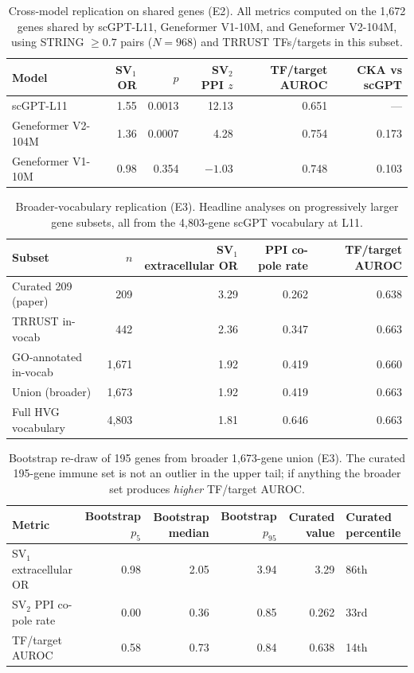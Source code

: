 \documentclass[12pt]{article}
\begin{document}
\begin{table}[!ht]
\centering
\caption{Cross-model replication on shared genes (E2). All metrics computed on the 1{,}672 genes shared by scGPT-L11, Geneformer V1-10M, and Geneformer V2-104M, using STRING $\geq 0.7$ pairs ($N = 968$) and TRRUST TFs/targets in this subset.}
\label{tab:cross_model}
\begin{tabular}{lrrrrr}
\toprule
Model & SV$_1$ OR & $p$ & SV$_2$ PPI $z$ & TF/target AUROC & CKA vs scGPT \\
\midrule
scGPT-L11           & 1.55 & 0.0013 & 12.13 & 0.651 & --- \\
Geneformer V2-104M  & 1.36 & 0.0007 &  4.28 & 0.754 & 0.173 \\
Geneformer V1-10M   & 0.98 & 0.354  & $-1.03$ & 0.748 & 0.103 \\
\bottomrule
\end{tabular}
\end{table}

\begin{table}[!ht]
\centering
\caption{Broader-vocabulary replication (E3). Headline analyses on progressively larger gene subsets, all from the 4{,}803-gene scGPT vocabulary at L11.}
\label{tab:broader_vocab}
\begin{tabular}{lrrrr}
\toprule
Subset & $n$ & SV$_1$ extracellular OR & PPI co-pole rate & TF/target AUROC \\
\midrule
Curated 209 (paper)        &   209 & 3.29 & 0.262 & 0.638 \\
TRRUST in-vocab            &   442 & 2.36 & 0.347 & 0.663 \\
GO-annotated in-vocab      & 1{,}671 & 1.92 & 0.419 & 0.660 \\
Union (broader)            & 1{,}673 & 1.92 & 0.419 & 0.663 \\
Full HVG vocabulary        & 4{,}803 & 1.81 & 0.646 & 0.663 \\
\bottomrule
\end{tabular}
\end{table}

\begin{table}[!ht]
\centering
\caption{Bootstrap re-draw of 195 genes from broader 1{,}673-gene union (E3). The curated 195-gene immune set is not an outlier in the upper tail; if anything the broader set produces \emph{higher} TF/target AUROC.}
\label{tab:bootstrap_subset}
\begin{tabular}{lrrrrl}
\toprule
Metric & Bootstrap $p_5$ & Bootstrap median & Bootstrap $p_{95}$ & Curated value & Curated percentile \\
\midrule
SV$_1$ extracellular OR & 0.98 & 2.05 & 3.94 & 3.29 & 86th \\
SV$_2$ PPI co-pole rate & 0.00 & 0.36 & 0.85 & 0.262 & 33rd \\
TF/target AUROC         & 0.58 & 0.73 & 0.84 & 0.638 & 14th \\
\bottomrule
\end{tabular}
\end{table}
\end{document}

